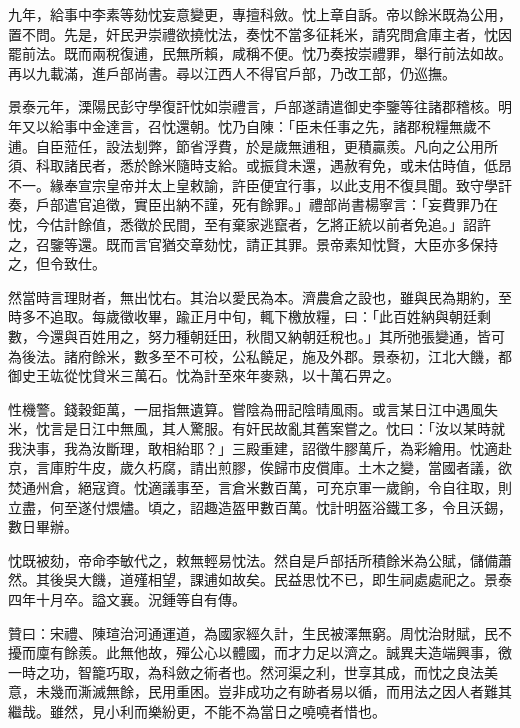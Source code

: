 \begin{pinyinscope}
九年，給事中李素等劾忱妄意變更，專擅科斂。忱上章自訴。帝以餘米既為公用，置不問。先是，奸民尹崇禮欲撓忱法，奏忱不當多征耗米，請究問倉庫主者，忱因罷前法。既而兩稅復逋，民無所賴，咸稱不便。忱乃奏按崇禮罪，舉行前法如故。再以九載滿，進戶部尚書。尋以江西人不得官戶部，乃改工部，仍巡撫。

景泰元年，溧陽民彭守學復訐忱如崇禮言，戶部遂請遣御史李鑒等往諸郡稽核。明年又以給事中金達言，召忱還朝。忱乃自陳：「臣未任事之先，諸郡稅糧無歲不逋。自臣蒞任，設法刬弊，節省浮費，於是歲無逋租，更積贏羨。凡向之公用所須、科取諸民者，悉於餘米隨時支給。或振貸未還，遇赦宥免，或未估時值，低昂不一。緣奉宣宗皇帝并太上皇敕諭，許臣便宜行事，以此支用不復具聞。致守學訐奏，戶部遣官追徵，實臣出納不謹，死有餘罪。」禮部尚書楊寧言：「妄費罪乃在忱，今估計餘值，悉徵於民間，至有棄家逃竄者，乞將正統以前者免追。」詔許之，召鑒等還。既而言官猶交章劾忱，請正其罪。景帝素知忱賢，大臣亦多保持之，但令致仕。

然當時言理財者，無出忱右。其治以愛民為本。濟農倉之設也，雖與民為期約，至時多不追取。每歲徵收畢，踰正月中旬，輒下檄放糧，曰：「此百姓納與朝廷剩數，今還與百姓用之，努力種朝廷田，秋間又納朝廷稅也。」其所弛張變通，皆可為後法。諸府餘米，數多至不可校，公私饒足，施及外郡。景泰初，江北大饑，都御史王竑從忱貸米三萬石。忱為計至來年麥熟，以十萬石畀之。

性機警。錢穀鉅萬，一屈指無遺算。嘗陰為冊記陰晴風雨。或言某日江中遇風失米，忱言是日江中無風，其人驚服。有奸民故亂其舊案嘗之。忱曰：「汝以某時就我決事，我為汝斷理，敢相紿耶？」三殿重建，詔徵牛膠萬斤，為彩繪用。忱適赴京，言庫貯牛皮，歲久朽腐，請出煎膠，俟歸市皮償庫。土木之變，當國者議，欲焚通州倉，絕寇資。忱適議事至，言倉米數百萬，可充京軍一歲餉，令自往取，則立盡，何至遂付煨燼。頃之，詔趣造盔甲數百萬。忱計明盔浴鐵工多，令且沃錫，數日畢辦。

忱既被劾，帝命李敏代之，敕無輕易忱法。然自是戶部括所積餘米為公賦，儲備蕭然。其後吳大饑，道殣相望，課逋如故矣。民益思忱不已，即生祠處處祀之。景泰四年十月卒。謚文襄。況鍾等自有傳。

贊曰：宋禮、陳瑄治河通運道，為國家經久計，生民被澤無窮。周忱治財賦，民不擾而廩有餘羨。此無他故，殫公心以體國，而才力足以濟之。誠異夫造端興事，徼一時之功，智籠巧取，為科斂之術者也。然河渠之利，世享其成，而忱之良法美意，未幾而澌滅無餘，民用重困。豈非成功之有跡者易以循，而用法之因人者難其繼哉。雖然，見小利而樂紛更，不能不為當日之嘵嘵者惜也。


\end{pinyinscope}